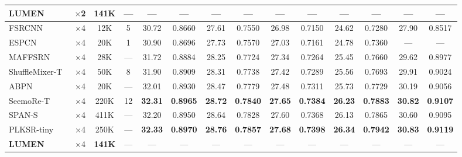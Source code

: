 \documentclass[10pt,twocolumn]{article}
\newcommand{\best}[1]{\textcolor{bestblue}{\textbf{#1}}}
\newcommand{\second}[1]{\textcolor{secondred}{\textbf{#1}}}
\begin{document}
\begin{table}[t]
\begin{tabular}{lcc c cc cc cc cc cc}
\rowcolor{lumengray}\textbf{LUMEN}
  & $\times$2 & \textbf{141K} & ---
  & ---   & ---    & ---   & ---    & ---   & ---    & ---   & ---    & ---   & ---    \\
\midrule
FSRCNN~\cite{dong2016accelerating}
  & $\times$4 & 12K & 5
  & 30.72 & 0.8660 & 27.61 & 0.7550 & 26.98 & 0.7150 & 24.62 & 0.7280 & 27.90 & 0.8517 \\
ESPCN~\cite{shi2016real}
  & $\times$4 & 20K & 1
  & 30.90 & 0.8696 & 27.73 & 0.7570 & 27.03 & 0.7161 & 24.78 & 0.7360 & ---   & ---    \\
MAFFSRN~\cite{muqeet2020multi}
  & $\times$4 & 28K & ---
  & 31.72 & 0.8884 & 28.25 & 0.7724 & 27.34 & 0.7264 & 25.45 & 0.7660 & 29.62 & 0.8977 \\
ShuffleMixer-T~\cite{sun2023shufflemixer}
  & $\times$4 & 50K & 8
  & 31.90 & 0.8909 & 28.31 & 0.7738 & 27.42 & 0.7289 & 25.56 & 0.7693 & 29.91 & 0.9024 \\
ABPN~\cite{du2021anchor}
  & $\times$4 & 20K & ---
  & 32.01 & 0.8930 & 28.47 & 0.7779 & 27.48 & 0.7311 & 25.73 & 0.7729 & 30.19 & 0.9056 \\
SeemoRe-T~\cite{zamfir2024see}
  & $\times$4 & 220K & 12
  & \second{32.31} & \second{0.8965} & \second{28.72} & \second{0.7840} & \second{27.65} & \second{0.7384} & \second{26.23} & \second{0.7883} & \second{30.82} & \second{0.9107} \\
SPAN-S~\cite{wan2024swift}
  & $\times$4 & 411K & ---
  & 32.20 & 0.8950 & 28.64 & 0.7828 & 27.60 & 0.7368 & 26.13 & 0.7865 & 30.60 & 0.9095 \\
PLKSR-tiny~\cite{lee2024plksr}
  & $\times$4 & 250K & ---
  & \best{32.33} & \best{0.8970} & \best{28.76} & \best{0.7857} & \best{27.68} & \best{0.7398} & \best{26.34} & \best{0.7942} & \best{30.83} & \best{0.9119} \\
\rowcolor{lumengray}\textbf{LUMEN}
  & $\times$4 & \textbf{141K} & ---
  & ---   & ---    & ---   & ---    & ---   & ---    & ---   & ---    & ---   & ---    \\
\bottomrule
\end{tabular}
\end{table}



\end{document}
